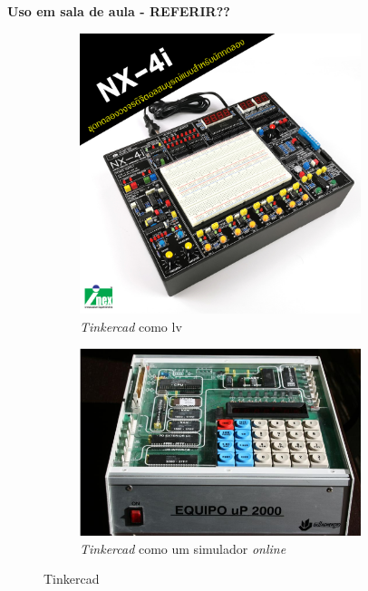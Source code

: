 \textbf{Uso em sala de aula - REFERIR??}
\begin{figure}[hbtp]
\centering
\begin{subfigure}[hbtp]{0.48\textwidth}
\centering
    \includegraphics[width=0.9\textwidth]{figures/nx-4i.jpg}
    \caption{\textit{Tinkercad} como \acrshort{lv}}
    \label{fig:nx4i}
\end{subfigure}
\begin{subfigure}[hbtp]{0.48\textwidth}
    \includegraphics[width=0.9\textwidth]{figures/image-1.png}
\caption{\textit{Tinkercad} como um simulador \textit{online}}
\label{fig:up}
\end{subfigure}
\caption{Tinkercad}
\label{fig:lab real}
\end{figure}

